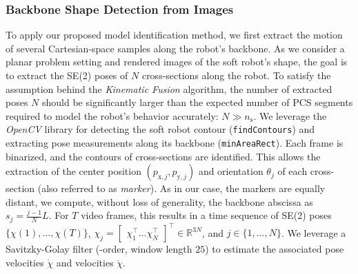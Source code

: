 \subsubsection{Backbone Shape Detection from Images}
To apply our proposed model identification method, we first extract the motion of several Cartesian-space samples along the robot's backbone.
As we consider a planar problem setting and rendered images of the soft robot's shape, the goal is to extract the SE(2) poses of $N$ cross-sections along the robot.
To satisfy the assumption behind the \emph{Kinematic Fusion} algorithm, the number of extracted poses $N$ should be significantly larger than the expected number of \gls{PCS} segments required to model the robot's behavior accurately: $N \gg n_\mathrm{s}$.
%
We leverage the \emph{OpenCV} library for detecting the soft robot contour (\texttt{findContours}) and extracting pose measurements along its backbone (\texttt{minAreaRect}).
Each frame is binarized, and the contours of cross-sections are identified.
This allows the extraction of the center position $(p_{\mathrm{x},j},p_{\mathrm{y},j})$ and orientation $\theta_j$ of each cross-section (also referred to as \emph{marker}).
As in our case, the markers are equally distant, we compute, without loss of generality, the backbone abscissa as $s_j= \frac{j-1}{N} L$. %
For $T$ video frames, this results in a time sequence of SE(2) poses $\{\chi (1),...,\chi (T) \}$,  $\chi_j = \begin{bmatrix}
    \chi_1^\top \dots \chi_N^\top
\end{bmatrix}^\top \in \mathbb{R}^{3N}$, and $j \in \{ 1, \dots, N \}$.
We leverage a Savitzky-Golay filter (-order, window length $25$) to estimate the associated pose velocities $\dot{\chi}$ and velocities $\ddot{\chi}$.

